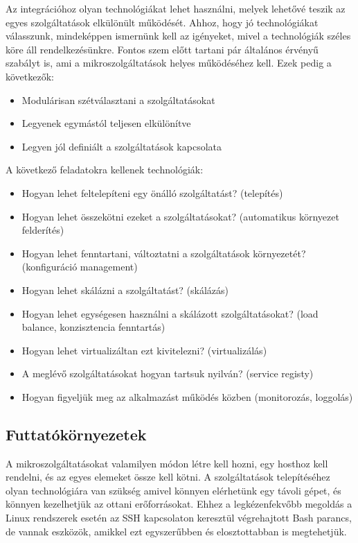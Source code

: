 \documentclass[11pt,magyar,a4paper,twoside,]{report}
\providecommand{\tightlist}{%
  \setlength{\itemsep}{0pt}\setlength{\parskip}{0pt}}
\begin{document}
Az integrációhoz olyan technológiákat\citep{micro-introPt1} lehet
használni, melyek lehetővé teszik az egyes szolgáltatások elkülönült
működését. Ahhoz, hogy jó technológiákat válasszunk, mindeképpen
ismernünk kell az igényeket, mivel a technológiák széles köre áll
rendelkezésünkre. Fontos szem előtt tartani pár általános érvényű
szabályt is\citep{micro-golden}, ami a mikroszolgáltatások helyes
működéséhez kell. Ezek pedig a következők:

\begin{itemize}
\tightlist
\item
  Modulárisan szétválasztani a szolgáltatásokat
\item
  Legyenek egymástól teljesen elkülönítve
\item
  Legyen jól definiált a szolgáltatások kapcsolata
\end{itemize}

A következő feladatokra kellenek technológiák:

\begin{itemize}
\tightlist
\item
  Hogyan lehet feltelepíteni egy önálló szolgáltatást? (telepítés)
\item
  Hogyan lehet összekötni ezeket a szolgáltatásokat? (automatikus
  környezet felderítés)
\item
  Hogyan lehet fenntartani, változtatni a szolgáltatások környezetét?
  (konfiguráció management)
\item
  Hogyan lehet skálázni a szolgáltatást? (skálázás)
\item
  Hogyan lehet egységesen használni a skálázott szolgáltatásokat? (load
  balance, konzisztencia fenntartás)
\item
  Hogyan lehet virtualizáltan ezt kivitelezni? (virtualizálás)
\item
  A meglévő szolgáltatásokat hogyan tartsuk nyilván? (service registy)
\item
  Hogyan figyeljük meg az alkalmazást működés közben (monitorozás,
  loggolás)
\end{itemize}

\subsection{Futtatókörnyezetek}\label{futtatuxf3kuxf6rnyezetek}

A mikroszolgáltatásokat valamilyen módon létre kell hozni, egy hosthoz
kell rendelni, és az egyes elemeket össze kell kötni. A szolgáltatások
telepítéséhez olyan technológiára van szükség amivel könnyen elérhetünk
egy távoli gépet, és könnyen kezelhetjük az ottani erőforrásokat. Ehhez
a legkézenfekvőbb megoldás a Linux rendszerek esetén az SSH kapcsolaton
keresztül végrehajtott Bash parancs, de vannak eszközök, amikkel ezt
egyszerűbben és elosztottabban is megtehetjük.
\end{document}
